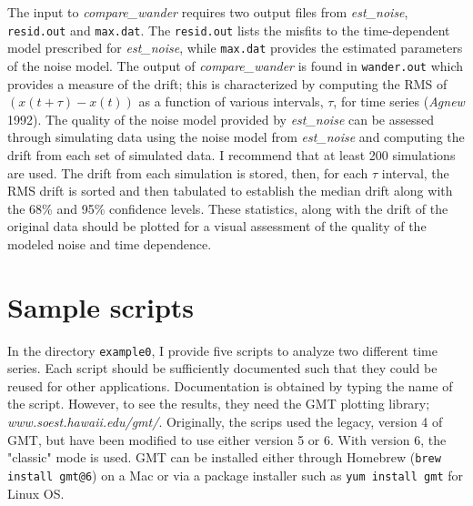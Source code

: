 \documentclass[12pt]{amsart}
\begin{document}
The input to  \textit{compare\_wander} requires two output files from \textit{est\_noise}, \texttt{resid.out} and \texttt{max.dat}.
The \texttt{resid.out} lists the misfits to the time-dependent model prescribed for \textit{est\_noise}, while \texttt{max.dat}
provides the estimated parameters of the noise model.  The output of \textit{compare\_wander} is found in \texttt{wander.out}
which provides a measure of the drift; this is characterized by computing the RMS of $(x(t+{\tau})-x(t))$ as a function of various
intervals, ${\tau}$, for  time series (\textit{Agnew} 1992). The quality of the noise model provided by \textit{est\_noise} can be assessed through
simulating data using the noise model from \textit{est\_noise} and computing the drift from each set of simulated data.
I recommend that at least 200 simulations are used.  The drift from each simulation is stored, then, for each ${\tau}$ interval,
the RMS drift is sorted and then tabulated to establish the median drift along with the 68\% and 95\% confidence levels.
These statistics, along with the drift of the original data should be plotted for a visual assessment of the quality of the
modeled noise and time dependence.


\section{Sample scripts}

In the directory \texttt{example0}, I provide five scripts to analyze two different time series. Each script should be
sufficiently documented such that they could be reused for other applications. Documentation is obtained by
typing the name of the script. However, to see the results,
they need the GMT plotting library; \textit{www.soest.hawaii.edu/gmt/}. Originally, the scrips used the
legacy, version 4 of GMT, but have been modified to use either version 5 or 6. With version 6, the "classic" mode
is used.  GMT can be installed either through Homebrew (\texttt{brew install gmt@6}) on a Mac or via a package installer
such as \texttt{yum install gmt} for Linux OS.
\end{document}
